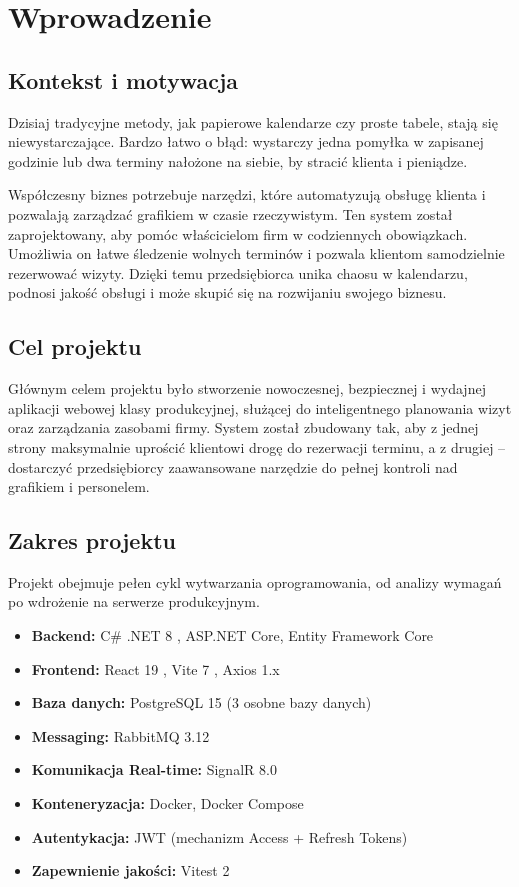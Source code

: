 \newpage
\renewcommand{\sectioncolor}{chap1}
\section{Wprowadzenie}

\subsection{Kontekst i motywacja}
Dzisiaj tradycyjne metody, jak papierowe kalendarze czy proste tabele, stają się niewystarczające. Bardzo łatwo o błąd: wystarczy jedna pomyłka w zapisanej godzinie lub dwa terminy nałożone na siebie, by stracić klienta i pieniądze.

Współczesny biznes potrzebuje narzędzi, które automatyzują obsługę klienta i pozwalają zarządzać grafikiem w czasie rzeczywistym. Ten system został zaprojektowany, aby pomóc właścicielom firm w codziennych obowiązkach. Umożliwia on łatwe śledzenie wolnych terminów i pozwala klientom samodzielnie rezerwować wizyty. Dzięki temu przedsiębiorca unika chaosu w kalendarzu, podnosi jakość obsługi i może skupić się na rozwijaniu swojego biznesu.

\subsection{Cel projektu}
Głównym celem projektu było stworzenie nowoczesnej, bezpiecznej i wydajnej aplikacji webowej klasy produkcyjnej, służącej do inteligentnego planowania wizyt oraz zarządzania zasobami firmy.
System został zbudowany tak, aby z jednej strony maksymalnie uprościć klientowi drogę do rezerwacji terminu, a z drugiej – dostarczyć przedsiębiorcy zaawansowane narzędzie do pełnej kontroli nad grafikiem i personelem.

\subsection{Zakres projektu}
Projekt obejmuje pełen cykl wytwarzania oprogramowania, od analizy wymagań po wdrożenie na serwerze produkcyjnym.
\begin{itemize}[leftmargin=*]

\item \textbf{Backend:} C\# .NET 8 \cite{dotnet_microsoft}, ASP.NET Core, Entity Framework Core
\item \textbf{Frontend:} React 19 \cite{react_meta}, Vite 7 \cite{vite_guide}, Axios 1.x \cite{axios_docs}
\item \textbf{Baza danych:} PostgreSQL 15 \cite{postgresql_docs} (3 osobne bazy danych)
\item \textbf{Messaging:} RabbitMQ 3.12 \cite{rabbitmq_docs}
\item \textbf{Komunikacja Real-time:} SignalR 8.0 \cite{signalr_microsoft}
\item \textbf{Konteneryzacja:} Docker, Docker Compose \cite{docker_docs}
\item \textbf{Autentykacja:} JWT \cite{jwt_rfc} (mechanizm Access + Refresh Tokens)
\item \textbf{Zapewnienie jakości:} Vitest 2 \cite{vitest_guide}
  
\end{itemize}

